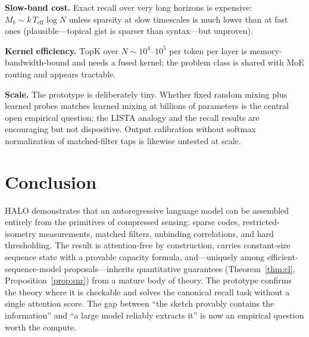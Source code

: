 \documentclass[11pt]{article}
\newcommand{\topk}{\mathrm{TopK}}
\begin{document}
\textbf{Slow-band cost.} Exact recall over very long horizons is expensive: $M_b \sim k\,T_{\mathrm{eff}}\log N$ unless sparsity at slow timescales is much lower than at fast ones (plausible---topical gist is sparser than syntax---but unproven).

\textbf{Kernel efficiency.} $\topk$ over $N \sim 10^4$--$10^5$ per token per layer is memory-bandwidth-bound and needs a fused kernel; the problem class is shared with MoE routing and appears tractable.

\textbf{Scale.} The prototype is deliberately tiny. Whether fixed random mixing plus learned probes matches learned mixing at billions of parameters is the central open empirical question; the LISTA analogy and the recall results are encouraging but not dispositive. Output calibration without softmax normalization of matched-filter taps is likewise untested at scale.

\section{Conclusion}

HALO demonstrates that an autoregressive language model can be assembled entirely from the primitives of compressed sensing: sparse codes, restricted-isometry measurements, matched filters, unbinding correlations, and hard thresholding. The result is attention-free by construction, carries constant-size sequence state with a provable capacity formula, and---uniquely among efficient-sequence-model proposals---inherits quantitative guarantees (Theorem~\ref{thm:cl}, Proposition~\ref{prop:snr}) from a mature body of theory. The prototype confirms the theory where it is checkable and solves the canonical recall task without a single attention score. The gap between ``the sketch provably contains the information'' and ``a large model reliably extracts it'' is now an empirical question worth the compute.
\end{document}
